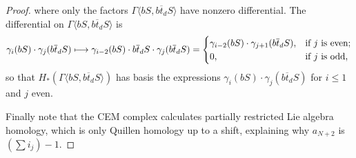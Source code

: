 \documentclass[10pt]{article}
\begin{document}
\begin{DimZeroPart}
\begin{proof}
where only the factors $\Gamma\langle bS,b\overline{t}_dS\rangle$ have nonzero differential. The differential on $\Gamma\langle bS,b\overline{t}_dS\rangle$ is
\[\gamma_i( bS)\cdot\gamma_j(b\overline{t}_dS)\mapsto\gamma_{i-2}( bS)\cdot b\overline{t}_dS\cdot\gamma_j(b\overline{t}_dS)=\begin{cases}
\gamma_{i-2}(bS)\cdot\gamma_{j+1}(b\overline{t}_dS),&\textup{if }j\textup{ is even};\\
0,&\textup{if }j\textup{ is odd},
\end{cases}
\]
so that $H_*(\Gamma\langle bS,b\overline{t}_dS\rangle)$ has basis the expressions $\gamma_i(bS)\cdot\gamma_j(b\overline{t}_dS)$ for $i\leq1$ and $j$ even.

Finally note that the CEM complex calculates partially restricted Lie algebra homology, which is only Quillen homology up to a shift, explaining why $a_{N+2}$ is $(\sum i_j)-1$.
\end{proof}

\end{DimZeroPart}
\end{document}

